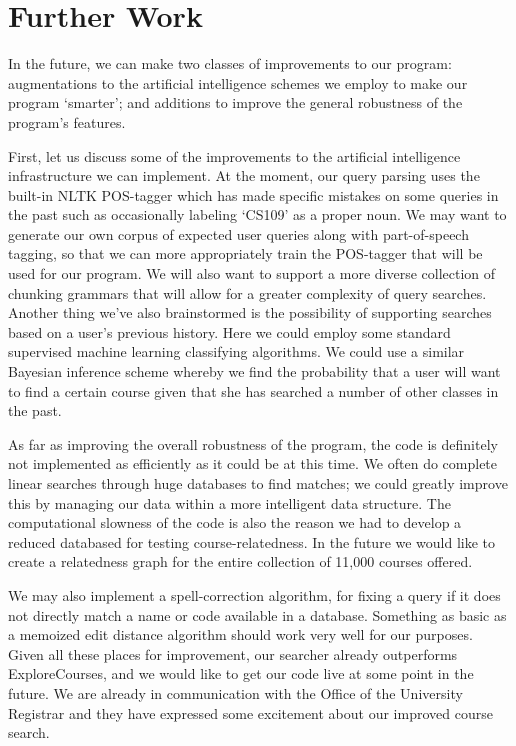 \documentclass[12pt]{article}
\begin{document}
\section*{Further Work}

In the future, we can make two classes of improvements to our program:
augmentations to the artificial intelligence schemes we employ to make
our program `smarter'; and additions to improve the general robustness
of the program's features.

First, let us discuss some of the improvements to the artificial
intelligence infrastructure we can implement. At the moment, our query
parsing uses the built-in NLTK POS-tagger which has made specific
mistakes on some queries in the past such as occasionally labeling
`CS109' as a proper noun. We may want to generate our own corpus of
expected user queries along with part-of-speech tagging, so that we
can more appropriately train the POS-tagger that will be used for our
program. We will also want to support a more diverse collection of
chunking grammars that will allow for a greater complexity of query
searches. Another thing we've also brainstormed is the possibility of
supporting searches based on a user's previous history. Here we could
employ some standard supervised machine learning classifying
algorithms. We could use a similar Bayesian inference scheme whereby
we find the probability that a user will want to find a certain course
given that she has searched a number of other classes in the past.

As far as improving the overall robustness of the program, the code is
definitely not implemented as efficiently as it could be at this
time. We often do complete linear searches through huge databases to
find matches; we could greatly improve this by managing our data
within a more intelligent data structure. The computational slowness
of the code is also the reason we had to develop a reduced databased
for testing course-relatedness. In the future we would like to create
a relatedness graph for the entire collection of 11,000 courses
offered. 

We may also implement a spell-correction algorithm,
for fixing a query if it does not directly match a name or code
available in a database. Something as basic as a memoized edit
distance algorithm should work very well for our purposes. Given all
these places for improvement, our searcher already outperforms
ExploreCourses, and we would like to get our code live at some point
in the future. We are already in communication with the Office of the
University Registrar and they have expressed some excitement about our
improved course search.
\end{document}
